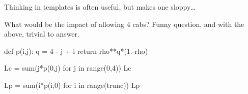 \begin{exercise}{\faPhoto}
\begin{solution}
Thinking in templates is often useful, but makes one sloppy\ldots

What would be the impact of allowing 4 cabs? Funny question, and with the above, trivial to answer.

\begin{pyconsole}
def p(i,j):
    q  = 4 - j + i
    return rho**q*(1.-rho)
  
\end{pyconsole}

\begin{pyconsole}
Lc = sum(j*p(0,j) for j in range(0,4))
Lc

Lp = sum(i*p(i,0) for i in range(trunc))
Lp
  
\end{pyconsole}
    \end{solution}
\end{exercise}







